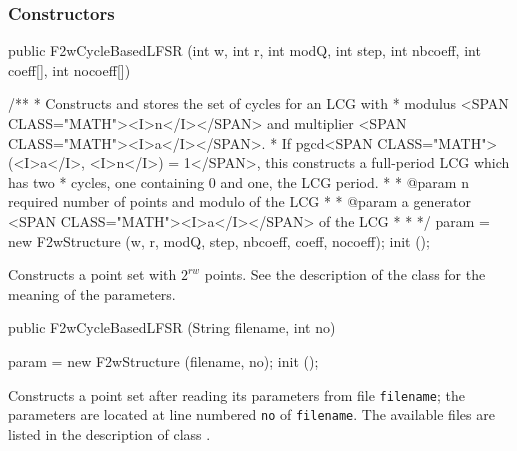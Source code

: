 \subsubsection*{Constructors}
\begin{code}

   public F2wCycleBasedLFSR (int w, int r, int modQ, int step, int nbcoeff,
                             int coeff[], int nocoeff[])\begin{hide}
    /**
     * Constructs and stores the set of cycles for an LCG with
     *    modulus <SPAN CLASS="MATH"><I>n</I></SPAN> and multiplier <SPAN CLASS="MATH"><I>a</I></SPAN>.
     *   If pgcd<SPAN CLASS="MATH">(<I>a</I>, <I>n</I>) = 1</SPAN>, this constructs a full-period LCG which has two
     *   cycles, one containing 0 and one, the LCG period.
     *
     * @param n required number of points and modulo of the LCG
     *
     *    @param a generator <SPAN CLASS="MATH"><I>a</I></SPAN> of the LCG
     *
     *
     */
   {
      param = new F2wStructure (w, r, modQ, step, nbcoeff, coeff, nocoeff);
      init ();
   }\end{hide}
\end{code}
 \begin{tabb}
Constructs a point set with $2^{rw}$ points.  See the description of the class
 for the meaning
 of the parameters.
 \end{tabb}
\begin{code}

   public F2wCycleBasedLFSR (String filename, int no) \begin{hide}
   {
      param = new F2wStructure (filename, no);
      init ();
   }\end{hide}
\end{code}
 \begin{tabb}
   Constructs a point set after reading its parameters from
   file \texttt{filename}; the parameters are located at line numbered \texttt{no}
   of  \texttt{filename}.  The available files are listed in the description of class
.
 \end{tabb}
